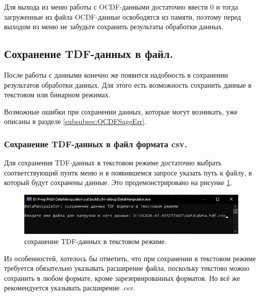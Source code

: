 {\standartFont

  \par Для выхода из меню работы с OCDF-данными достаточно ввести 0 и тогда загруженные из файла OCDF-данные освободятся из памяти, поэтому перед выходом из меню не забудьте сохранить результаты обработки данных. 

  \par
}

\subsection{ \standartTitleFont
  Сохранение TDF-данных в файл.
} \label{subsec:TDFSafe}

{\standartFont

  \par После работы с данными конечно же появится надобность в сохранении результатов обработки данных. Для этого есть возможность сохранить данные в текстовом или бинарном режимах. 

  \par Возможные ошибки при сохранении данных, которые могут возникать, уже описаны в разделе \ref{subsubsec:OCDFSageErr}.

  \par 
}

\subsubsection{ \standartTitleFont
  Сохранение TDF-данных в файл формата csv.
} \label{subsubsec:TDFSafeCSV}

{\standartFont

  \par Для сохранения TDF-данных в текстовом режиме достаточно выбрать соответствующий пунтк меню и в появившемся запросе указать путь к файлу, в который будут сохранены данные. Это продемонстрировано на рисунке \ref{fig:TDFsafeCSV}.

  \begin{figure}[H]
    \centering
    \includegraphics[width=\textwidth]{images/forDataManipulator/TDFsafeCSV.png}
    \caption{сохранение TDF-данных в текстовом режиме.} 
    \label{fig:TDFsafeCSV}
  \end{figure}

  \par Из особенностей, хотелось бы отметить, что при сохранении в текстовом режиме требуется обязательно указывать расширение файла, поскольку текстово можно сохранить в любом формате, кроме зарезервированных форматов. Но всё же рекомендуется указывать расширение .csv.
}

